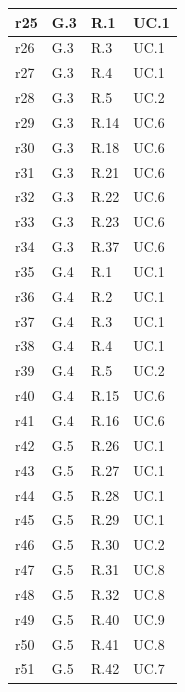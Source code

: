 \begin{longtable}{|l|l|l|l|}
r25    & G.3     & R.1    &         UC.1    \\ \hline
r26    & G.3     & R.3    &         UC.1    \\ \hline
r27    & G.3     & R.4    &         UC.1    \\ \hline
r28    & G.3     & R.5    &         UC.2    \\ \hline
r29    & G.3     & R.14   &         UC.6    \\ \hline
r30    & G.3     & R.18   &         UC.6    \\ \hline
r31    & G.3     & R.21   &         UC.6    \\ \hline
r32    & G.3     & R.22   &         UC.6    \\ \hline
r33    & G.3     & R.23   &         UC.6    \\ \hline
r34    & G.3     & R.37   &         UC.6    \\ \hline

r35    & G.4     & R.1    &         UC.1    \\ \hline
r36    & G.4     & R.2    &         UC.1    \\ \hline
r37    & G.4     & R.3    &         UC.1    \\ \hline
r38    & G.4     & R.4    &         UC.1    \\ \hline
r39    & G.4     & R.5   &         UC.2    \\ \hline
r40    & G.4     & R.15   &         UC.6    \\ \hline
r41    & G.4     & R.16   &         UC.6    \\ \hline

r42    & G.5     & R.26   &         UC.1    \\ \hline
r43    & G.5     & R.27   &         UC.1    \\ \hline
r44    & G.5     & R.28   &         UC.1    \\ \hline
r45    & G.5     & R.29   &         UC.1        \\ \hline
r46    & G.5     & R.30   &         UC.2    \\ \hline
r47    & G.5     & R.31   &         UC.8    \\ \hline
r48    & G.5     & R.32   &         UC.8    \\ \hline
r49    & G.5     & R.40   &         UC.9    \\ \hline
r50    & G.5     & R.41   &         UC.8    \\ \hline
r51    & G.5     & R.42   &         UC.7    \\ \hline


\end{longtable}
